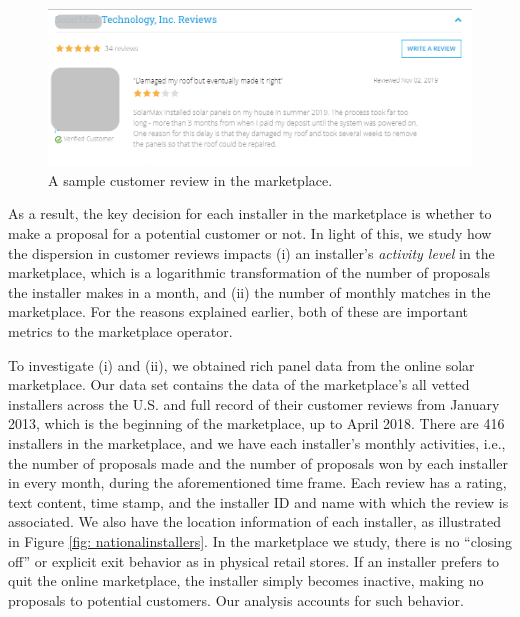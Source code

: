 \documentclass[msom,blindrev]{informs3}
\begin{document}
	
	\begin{figure}
		\centering
		\includegraphics[width=0.81\linewidth]{reviews_example.png}
		\caption{A sample customer review in the marketplace.}
		\label{reviews_example}
	\end{figure}
	
	As a result, the key decision for each installer in the marketplace is whether to make a proposal for a potential customer or not. In light of this, we study how the dispersion in customer reviews impacts (i) an installer's \emph{activity level} in the marketplace, which is a logarithmic transformation of the number of proposals the installer makes in a month, and (ii) the number of monthly matches in the marketplace. For the reasons explained earlier, both of these are important metrics to the marketplace operator.
	
	
	
	To investigate (i) and (ii), we obtained rich panel data from the online solar marketplace. Our data set contains the data of the marketplace's all vetted installers across the U.S. and full record of their customer reviews from January 2013, which is the beginning of the marketplace, up to April 2018. There are 416 installers in the marketplace, and we have each installer's monthly activities, i.e., the number of proposals made and the number of proposals won by each installer in every month, during the aforementioned time frame. Each review has a rating, text content, time stamp, and the installer ID and name with which the review is associated. We also have the location information of each installer, as illustrated in Figure \ref{fig: nationalinstallers}. In the marketplace we study, there is no ``closing off'' or explicit exit behavior as in physical retail stores. If an installer prefers to quit the online marketplace, the installer simply becomes inactive, making no proposals to potential customers. Our analysis accounts for such behavior.
	
	
	
	
\end{document}
